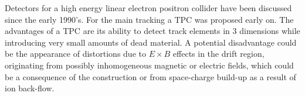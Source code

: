 %


% 

Detectors for a high energy linear electron positron collider have been discussed since the early 1990's. For the main tracking a TPC was proposed early on.
The advantages of a TPC are its ability to detect track elements in 3 dimensions while introducing very small amounts of dead material. A potential disadvantage could be the appearance of distortions due to $E \times B$ effects in the drift region, originating from possibly inhomogeneous magnetic or electric fields, which could be a consequence of the construction or from space-charge build-up as a result of ion back-flow.

